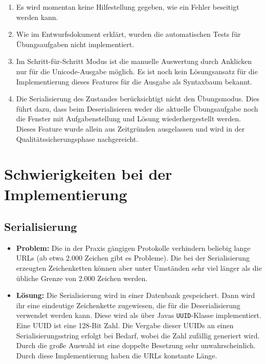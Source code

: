\documentclass[parskip=full,11pt]{scrartcl}
\begin{document}
\begin{enumerate}
\item Es wird momentan keine Hilfestellung gegeben, wie ein Fehler beseitigt werden kann.

\item Wie im Entwurfsdokument erklärt, wurden die automatischen Tests für Übungsaufgaben nicht implementiert.

\item Im Schritt-für-Schritt Modus ist die manuelle Auswertung durch Anklicken nur für die Unicode-Ausgabe möglich.
Es ist noch kein Lösungsansatz für die Implementierung dieses Features für die Ausgabe als Syntaxbaum bekannt.

\item Die Serialisierung des Zustandes berücksichtigt nicht den Übungsmodus.
Dies führt dazu, dass beim Deserialisieren weder die aktuelle Übungsaufgabe noch die Fenster mit Aufgabenstellung und Lösung wiederhergestellt werden.
Dieses Feature wurde allein aus Zeitgründen ausgelassen und wird in der Qualitätssicherungsphase nachgereicht.
\end{enumerate}

\section{Schwierigkeiten bei der Implementierung}
\subsection{Serialisierung}
\begin{itemize}
\item[] \textbf{Problem:}
Die in der Praxis gängigen Protokolle verhindern beliebig lange URLs (ab etwa 2.000 Zeichen gibt es Probleme).
Die bei der Serialisierung erzeugten Zeichenketten können aber unter Umständen sehr viel länger als die übliche Grenze von 2.000 Zeichen werden.
\item[] \textbf{Lösung:}
Die Serialisierung wird in einer Datenbank gespeichert.
Dann wird ihr eine eindeutige Zeichenkette zugewiesen, die für die Deserialisierung verwendet werden kann.
Diese wird als über Javas \texttt{UUID}-Klasse implementiert.
Eine UUID ist eine 128-Bit Zahl.
Die Vergabe dieser UUIDs an einen Serialisierungsstring erfolgt bei Bedarf, wobei die Zahl zufällig generiert wird.
Durch die große Auswahl ist eine doppelte Besetzung sehr unwahrscheinlich.
Durch diese Implementierung haben die URLs konstante Länge.
\end{itemize}
\end{document}

